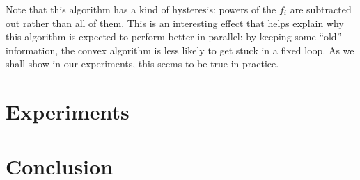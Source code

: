 \documentclass[times, 10pt,twocolumn]{article}
\begin{document}
Note that this algorithm has a kind of hysteresis: powers of the
$f_i$ are subtracted out rather than all of them. This is an
interesting effect that helps explain why this algorithm is
expected to perform better in parallel: by keeping some ``old''
information, the convex algorithm is less likely to get stuck
in a fixed loop. As we shall show in our experiments, this seems to
be true in practice.

\section{Experiments}

\section{Conclusion}


\nocite{ex1,ex2}


\end{document}
